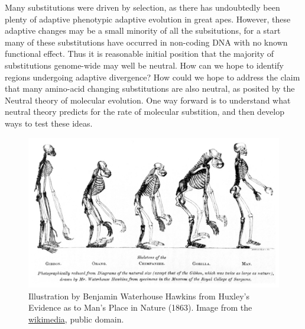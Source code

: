 
Many substitutions were driven by selection, as there has undoubtedly
been plenty of adaptive phenotypic adaptive evolution in great apes. However, these adaptive changes may be a small
minority of all the subsitutions, for a start many of these substitutions have occurred in
non-coding DNA with no known functional effect. Thus it is reasonable
initial position that the majority of substitutions genome-wide may well be
neutral. 
How can we hope to identify regions undergoing adaptive divergence?
How could we hope to address the claim that many amino-acid changing
substitutions are also neutral, as posited by the Neutral theory of
molecular evolution. One way forward is to understand what neutral theory predicts for the
rate of molecular substition, and then develop ways to test
these ideas. 

\begin{figure}
\begin{center}
  \includegraphics[width = \textwidth]{illustration_images/Genetic_drift/Huxley_mans_place/Huxley_Mans_Place_in_Nature.jpg}
\end{center}
\caption{Illustration by Benjamin Waterhouse Hawkins from Huxley's
  Evidence as to Man's Place in Nature (1863).
\newline \noindent \tiny{Image from the
  \href{https://en.wikipedia.org/wiki/Pithecometra_principle\#/media/File:Huxley_-_Mans_Place_in_Nature.jpg}{wikimedia},
   public domain.} 
} \label{fig:Huxley_man}
\end{figure}


